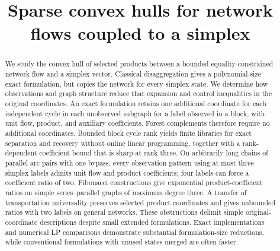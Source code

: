 \documentclass[11pt]{article}
\title{Sparse convex hulls for network flows coupled to a simplex}
\author{}
\date{}
\theoremstyle{definition}
\theoremstyle{remark}
\begin{document}
\maketitle
\begin{abstract}
We study the convex hull of selected products between a bounded
equality-constrained network flow and a simplex vector. Classical
disaggregation gives a polynomial-size exact formulation, but copies the
network for every simplex state. We determine how observations and graph
structure reduce that expansion and control inequalities in the original
coordinates. An exact formulation retains one additional coordinate for each
independent cycle in each unobserved subgraph for a label observed in a block, with unit flow,
product, and auxiliary coefficients. Forest complements therefore require
no additional coordinates. Bounded block cycle rank yields finite libraries
for exact separation and recovery without online linear programming, together
with a rank-dependent coefficient bound that is sharp at rank three.
On arbitrarily long chains of parallel arc pairs with one bypass, every
observation pattern using at most three simplex labels admits unit flow
and product coefficients; four labels can force a coefficient ratio of two.
Fibonacci constructions give exponential product-coefficient ratios on
simple series--parallel graphs of maximum degree three. A transfer of
transportation universality preserves selected product coordinates and gives
unbounded ratios with two labels on general networks. These obstructions
delimit simple original-coordinate descriptions despite small extended
formulations. Exact implementations and numerical LP comparisons demonstrate
substantial formulation-size reductions, while conventional formulations
with unused states merged are often faster.
\end{abstract}














\end{document}
